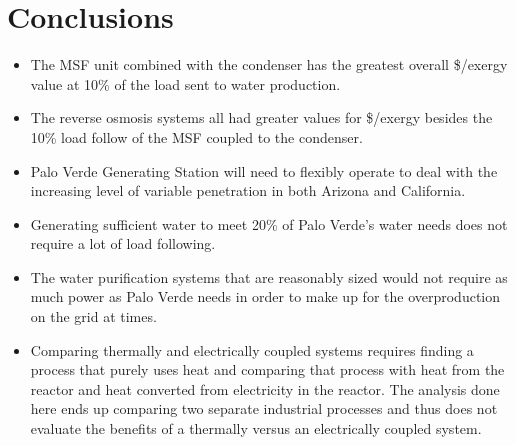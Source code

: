 \section{Conclusions}
\begin{itemize}
\item The MSF unit combined with the condenser has the greatest overall \$/exergy value at 10\% of the load sent to water production.
\item The reverse osmosis systems all had greater values for \$/exergy besides the 10\% load follow of the MSF coupled to the condenser.
\item Palo Verde Generating Station will need to flexibly operate to deal with the increasing level of variable penetration in both Arizona and California.
\item Generating sufficient water to meet 20\% of Palo Verde's water needs does not require a lot of load following.
\item The water purification systems that are reasonably sized would not require as much power as Palo Verde needs in order to make up for the overproduction on the grid at times.
\item Comparing thermally and electrically coupled systems requires finding a process that purely uses heat and comparing that process with heat from the reactor and heat converted from electricity in the reactor.  The analysis done here ends up comparing two separate industrial processes and thus does not evaluate the benefits of a thermally versus an electrically coupled system.
\end{itemize}
